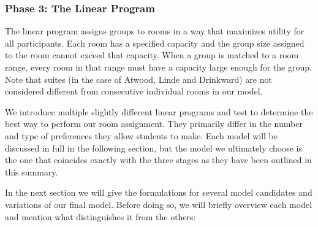 \documentclass[12pt]{article}
\begin{document}
    \subsubsection*{Phase 3: The Linear Program} 
    The linear program assigns groups to rooms in a way that maximizes utility for all participants. Each room has a specified capacity and the group size assigned to the room cannot exceed that capacity.  When a group is matched to a room range, every room in that range must have a capacity large enough for the group. Note that suites (in the case of Atwood, Linde and Drinkward) are not considered different from consecutive individual rooms in our model. 
    
    We introduce multiple slightly different linear programs and test to determine the best way to perform our room assignment. They primarily differ in the number and type of preferences they allow students to make. Each model will be discussed in full in the following section, but the model we ultimately choose is the one that coincides exactly with the three stages as they have been outlined in this summary. 
    
    In the next section we will give the formulations for several model candidates and variations of our final model. Before doing so, we will briefly overview each model and mention what distinguishes it from the others:
\end{document}
